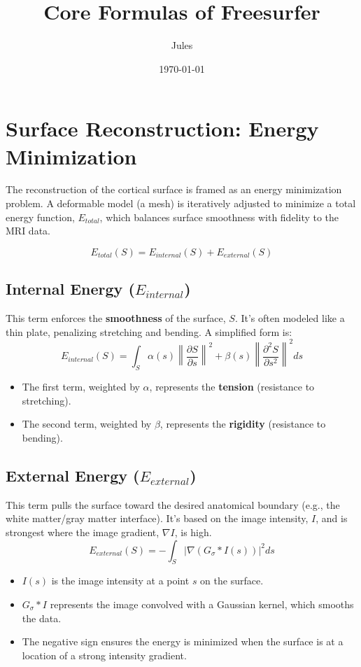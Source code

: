 \documentclass[12pt]{article}
\title{Core Formulas of Freesurfer}
\author{Jules}
\date{\today}
\begin{document}
\maketitle

\tableofcontents

\section{Surface Reconstruction: Energy Minimization}

The reconstruction of the cortical surface is framed as an energy minimization problem. A deformable model (a mesh) is iteratively adjusted to minimize a total energy function, $E_{total}$, which balances surface smoothness with fidelity to the MRI data.

\begin{equation}
E_{total}(S) = E_{internal}(S) + E_{external}(S)
\end{equation}

\subsection{Internal Energy ($E_{internal}$)}
This term enforces the \textbf{smoothness} of the surface, $S$. It's often modeled like a thin plate, penalizing stretching and bending. A simplified form is:
\begin{equation}
E_{internal}(S) = \int_{S} \alpha(s) \left\| \frac{\partial S}{\partial s} \right\|^2 + \beta(s) \left\| \frac{\partial^2 S}{\partial s^2} \right\|^2 ds
\end{equation}
\begin{itemize}
    \item The first term, weighted by $\alpha$, represents the \textbf{tension} (resistance to stretching).
    \item The second term, weighted by $\beta$, represents the \textbf{rigidity} (resistance to bending).
\end{itemize}

\subsection{External Energy ($E_{external}$)}
This term pulls the surface toward the desired anatomical boundary (e.g., the white matter/gray matter interface). It's based on the image intensity, $I$, and is strongest where the image gradient, $\nabla I$, is high.
\begin{equation}
E_{external}(S) = - \int_{S} \left| \nabla (G_{\sigma} * I(s)) \right|^2 ds
\end{equation}
\begin{itemize}
    \item $I(s)$ is the image intensity at a point $s$ on the surface.
    \item $G_{\sigma} * I$ represents the image convolved with a Gaussian kernel, which smooths the data.
    \item The negative sign ensures the energy is minimized when the surface is at a location of a strong intensity gradient.
\end{itemize}
\end{document}
